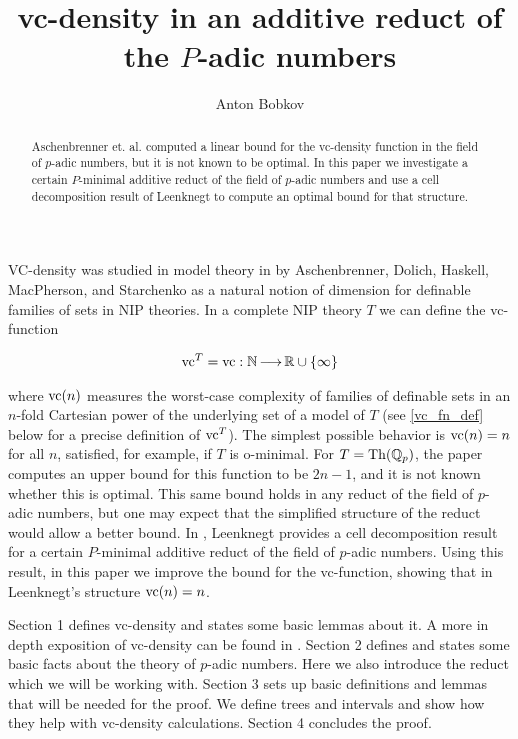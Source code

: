 \documentclass{amsart}
\title{vc-density in an additive reduct of the $P$-adic numbers}
\author{Anton Bobkov}
\newcommand{\curly}[1]{\left\{#1\right\}}
\begin{document}
\begin{abstract}
  Aschenbrenner et. al. computed a linear bound for the vc-density function in the field of $p$-adic numbers,
  but it is not known to be optimal.
  In this paper we investigate a certain $P$-minimal additive reduct of the field of $p$-adic numbers and
  use a cell decomposition result of Leenknegt to compute an optimal bound for that structure.
\end{abstract}


\maketitle

VC-density was studied in model theory in \cite{density} by Aschenbrenner, Dolich, Haskell, MacPherson, and Starchenko
as a natural notion of dimension for definable families of sets in NIP theories.
In a complete NIP theory $T$ we can define the vc-function

\begin{align*}
  \vc^T = \vc : \N \arr \R \cup \curly{\infty}
\end{align*}

where $\operatorname{vc}(n)$ measures the worst-case complexity of families of definable sets in an $n$-fold Cartesian power of the underlying set of a model of $T$
(see \ref{vc_fn_def} below for a precise definition of $\operatorname{vc}^T$).
The simplest possible behavior is $\operatorname{vc}(n) = n$ for all $n$,
satisfied, for example, if $T$ is o-minimal.
For $T = \operatorname{Th}(\mathbb{Q}_p)$, the paper \cite{density} computes an upper bound for this function to be $2n-1$, and it is not known whether this is optimal.
This same bound holds in any reduct of the field of $p$-adic numbers, but one may expect that the simplified structure of the reduct would allow a better bound.
In \cite{reduct}, Leenknegt provides a cell decomposition result for a certain $P$-minimal additive reduct of the field of $p$-adic numbers.
Using this result, in this paper we improve the bound for the vc-function, showing that in Leenknegt's structure $\operatorname{vc}(n) = n$.

Section 1 defines vc-density and states some basic lemmas about it.
A more in depth exposition of vc-density can be found in \cite{density}.
Section 2 defines and states some basic facts about the theory of $p$-adic numbers.
Here we also introduce the reduct which we will be working with.
Section 3 sets up basic definitions and lemmas that will be needed for the proof.
We define trees and intervals and show how they help with vc-density calculations.
Section 4 concludes the proof.
\end{document}
